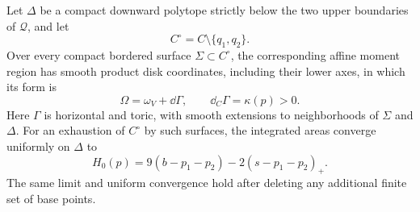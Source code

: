 \begin{lemma}\label{six:toric-model}
Let \(\Delta\) be a compact downward polytope strictly below the
two upper boundaries of \(\mathcal Q\), and let
\[
 C^\circ=C\setminus\{q_1,q_2\}.
\]
Over every compact bordered surface
\(\Sigma\subset C^\circ\), the corresponding affine moment
region has smooth product disk coordinates, including their
lower axes, in which its form is
\begin{equation}\label{six:surface-form}
 \Omega=\omega_V+\dd\Gamma,\qquad
 \dd_C\Gamma=\kappa(p)>0.
\end{equation}
Here \(\Gamma\) is horizontal and toric, with smooth extensions
to neighborhoods of \(\Sigma\) and \(\Delta\).  For an exhaustion
of \(C^\circ\) by such surfaces, the integrated areas converge
uniformly on \(\Delta\) to
\begin{equation}\label{six:area}
 H_0(p)=9(b-p_1-p_2)-2(s-p_1-p_2)_+.
\end{equation}
The same limit and uniform convergence hold after deleting any
additional finite set of base points.
\end{lemma}

